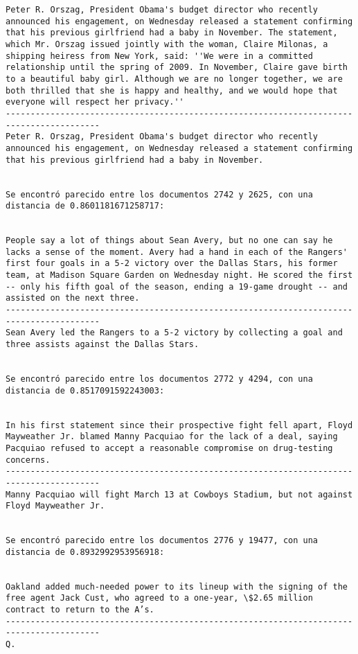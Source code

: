 \documentclass[11pt]{article}
\begin{document}
\begin{Verbatim}[commandchars=\\\{\}]
Peter R. Orszag, President Obama's budget director who recently announced his engagement, on Wednesday released a statement confirming that his previous girlfriend had a baby in November. The statement, which Mr. Orszag issued jointly with the woman, Claire Milonas, a shipping heiress from New York, said: ''We were in a committed relationship until the spring of 2009. In November, Claire gave birth to a beautiful baby girl. Although we are no longer together, we are both thrilled that she is happy and healthy, and we would hope that everyone will respect her privacy.''
-----------------------------------------------------------------------------------------
Peter R. Orszag, President Obama's budget director who recently announced his engagement, on Wednesday released a statement confirming that his previous girlfriend had a baby in November.


Se encontró parecido entre los documentos 2742 y 2625, con una distancia de 0.8601181671258717:


People say a lot of things about Sean Avery, but no one can say he lacks a sense of the moment. Avery had a hand in each of the Rangers' first four goals in a 5-2 victory over the Dallas Stars, his former team, at Madison Square Garden on Wednesday night. He scored the first -- only his fifth goal of the season, ending a 19-game drought -- and assisted on the next three.
-----------------------------------------------------------------------------------------
Sean Avery led the Rangers to a 5-2 victory by collecting a goal and three assists against the Dallas Stars.


Se encontró parecido entre los documentos 2772 y 4294, con una distancia de 0.8517091592243003:


In his first statement since their prospective fight fell apart, Floyd Mayweather Jr. blamed Manny Pacquiao for the lack of a deal, saying Pacquiao refused to accept a reasonable compromise on drug-testing concerns.
-----------------------------------------------------------------------------------------
Manny Pacquiao will fight March 13 at Cowboys Stadium, but not against Floyd Mayweather Jr.


Se encontró parecido entre los documentos 2776 y 19477, con una distancia de 0.8932992953956918:


Oakland added much-needed power to its lineup with the signing of the free agent Jack Cust, who agreed to a one-year, \$2.65 million contract to return to the A’s.
-----------------------------------------------------------------------------------------
Q.



\end{Verbatim}
\end{document}
